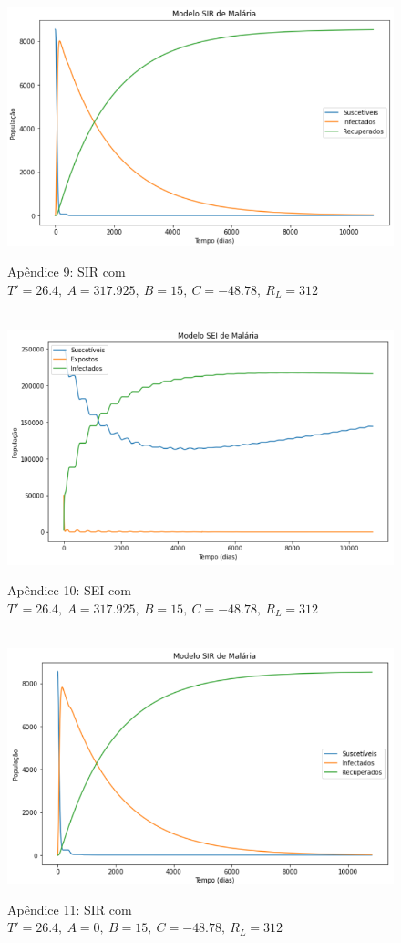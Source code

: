 \documentclass[12pt]{article}
\begin{document}
\begin{figure}[!ht]
        \centering
        \hbox{\hspace{4.0em} \includegraphics[scale=0.6] {SIR_Correcao_max_A317.png}}
        \caption*{Apêndice 9: SIR com $T'=26.4, \ A=317.925, \ B=15, \ C=-48.78, \ R_L=312$}
\end{figure} 
\begin{figure}[!ht]
        \centering
        \hbox{\hspace{3.5em} \includegraphics[scale=0.6] {SEI_Correcao_max_A317.png}}
        \caption*{Apêndice 10: SEI com $T'=26.4, \ A=317.925, \ B=15, \ C=-48.78, \ R_L=312$}
\end{figure}
\newpage
\begin{figure}[!ht]
        \centering
        \hbox{\hspace{4.0em} \includegraphics[scale=0.6] {SIR_Correcao_max_A0.png}}
        \caption*{Apêndice 11: SIR com $T'=26.4, \ A=0, \ B=15, \ C=-48.78, \ R_L=312$}
\end{figure} 
\end{document}
